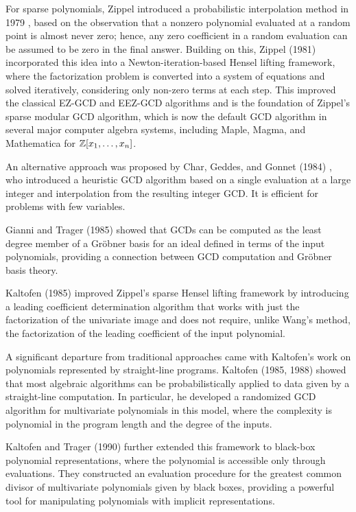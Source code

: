 \documentclass{article}
\numberwithin{equation}{section}
\begin{document}
For sparse polynomials, Zippel introduced a probabilistic interpolation method in 1979 \cite{zippel1979}, based on the observation that a nonzero polynomial evaluated at a random point is almost never zero; hence, any zero coefficient in a random evaluation can be assumed to be zero in the final answer. Building on this, Zippel (1981) \cite{zippel1981} incorporated this idea into a Newton-iteration-based Hensel lifting framework, where the factorization problem is converted into a system of equations and solved iteratively, considering only non-zero terms at each step. This improved the classical EZ-GCD and EEZ-GCD algorithms and is the foundation of Zippel's sparse modular GCD algorithm, which is now the default GCD algorithm in several major computer algebra systems, including Maple, Magma, and Mathematica  \cite{HuMonagan2021} for ${\mathbb Z}[x_1,\dots,x_n]$.

An alternative approach was proposed by Char, Geddes, and Gonnet (1984) \cite{char1984gcdheu}, who introduced a heuristic GCD algorithm based on a single evaluation at a large integer and interpolation from the resulting integer GCD.  It is efficient for problems with few variables.

  Gianni and Trager (1985) \cite{gianni1985gcd} showed that GCDs can be computed as the least degree member of a Gr\"obner basis for an ideal defined in terms of the input polynomials, providing a connection between GCD computation and Gr\"obner basis theory.


Kaltofen (1985) \cite{kaltofen1985b} improved Zippel's sparse Hensel lifting framework by introducing a leading coefficient determination algorithm that works with just the factorization of the univariate image and does not require, unlike Wang's method, the factorization of the leading coefficient of the input polynomial.


A significant departure from traditional approaches came with Kaltofen's work on polynomials represented by straight-line programs. Kaltofen (1985, 1988) \cite{kaltofen1985,kaltofen1988} showed that most algebraic algorithms can be probabilistically applied to data given by a straight-line computation. In particular, he developed a randomized GCD algorithm for multivariate polynomials in this model, where the complexity is polynomial in the program length and the degree of the inputs.

Kaltofen and Trager (1990) \cite{kaltofen1990} further extended this framework to black-box polynomial representations, where the polynomial is accessible only through evaluations. They constructed an evaluation procedure for the greatest common divisor of multivariate polynomials given by black boxes, providing a powerful tool for manipulating polynomials with implicit representations.
\end{document}
